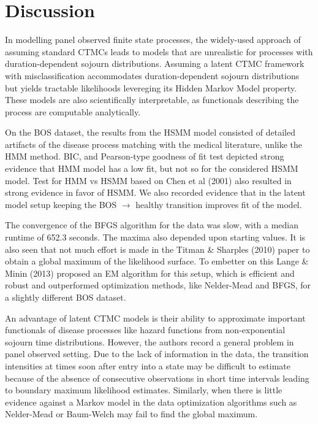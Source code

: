 \documentclass{uwstat572}
\begin{document}
\section{Discussion}

In modelling panel observed finite state processes, the widely-used approach of assuming standard CTMCs leads to models that are unrealistic for processes with duration-dependent sojourn distributions. Assuming a latent CTMC framework with misclassification accommodates duration-dependent sojourn distributions but yields tractable likelihoods levereging its Hidden Markov Model property. These models are also scientifically interpretable, as functionals describing the process are computable analytically.

On the BOS dataset, the results from the HSMM model consisted of detailed artifacts of the disease process matching with the medical literature, unlike the HMM method. BIC, and Pearson-type goodness of fit test depicted strong evidence that HMM model has a low fit, but not so for the considered HSMM model. Test for HMM vs HSMM based on Chen et al (2001) also resulted in strong evidence in favor of HSMM. We also recorded evidence that in the latent model setup keeping the BOS $\rightarrow$ healthy transition improves fit of the model.

The convergence of the BFGS algorithm for the data was slow, with a median runtime of 652.3 seconds. The maxima also depended upon starting values. It is also seen that not much effort is made in the Titman \& Sharples (2010) paper to obtain a global maximum of the likelihood surface. To embetter on this Lange \& Minin (2013) proposed an EM algorithm for this setup, which is efficient and robust and outperformed optimization methods, like Nelder-Mead and BFGS, for a slightly different BOS dataset.

An advantage of latent CTMC models is their ability to approximate important functionals of disease processes like hazard functions from non-exponential sojourn time distributions. However, the authors record a general problem in panel observed setting. Due to the lack of information in the data, the transition intensities at times soon after entry into a state may be difficult to estimate because of the absence of consecutive observations in short time intervals leading to boundary maximum likelihood estimates. Similarly, when there is little evidence against a Markov model in the data optimization algorithms such as Nelder-Mead or Baum-Welch may fail to find the global maximum.
\end{document}
